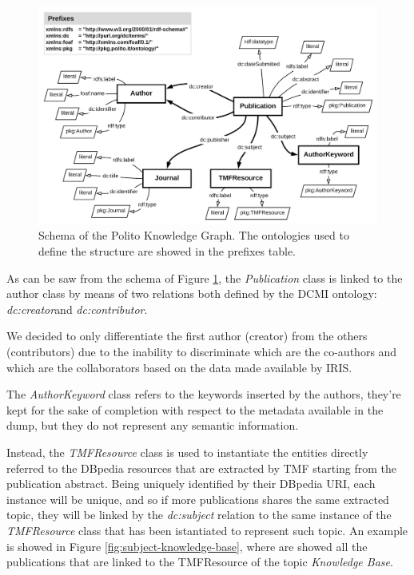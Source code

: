 \documentclass[%
    corpo=13.5pt,
    twoside,
    oldstyle,
    tipotesi=magistrale,
    greek,
    evenboxes
]{toptesi}
\begin{document}
\begin{figure}[h]
    \centering
    \includegraphics[scale=0.20]{img/schema.png}
    \caption{Schema of the Polito Knowledge Graph. The ontologies used to
    define the structure are showed in the prefixes table.}
    \label{fig:schema}
\end{figure}

As can be saw from the schema of Figure \ref{fig:schema}, the \emph{Publication}
class is linked to the author class by means of two relations both defined by
the DCMI ontology:
\emph{dc:creator}\footnotemark and \emph{dc:contributor}\footnotemark[\value{footnote}].

We decided to only differentiate the first author (creator) from
the others (contributors) due to the inability to discriminate which are the
co-authors and which are the collaborators based on the data made available
by IRIS.

The \emph{AuthorKeyword} class refers to the keywords inserted by the authors,
they're kept for the sake of completion with respect to the metadata available
in the dump, but they do not represent any semantic information.

Instead, the \emph{TMFResource} class is used to instantiate the entities
directly referred to the DBpedia resources that are extracted by TMF starting
from the publication abstract. Being
uniquely identified by their DBpedia URI, each instance will be unique, and so
if more publications shares the same extracted topic, they will be linked
by the \emph{dc:subject} relation to the same instance of the
\emph{TMFResource} class that has been istantiated to represent such topic.
An example is showed in Figure \ref{fig:subject-knowledge-base}, where are
showed all the publications that are linked to the TMFResource of the
topic \emph{Knowledge Base}.
\end{document}

